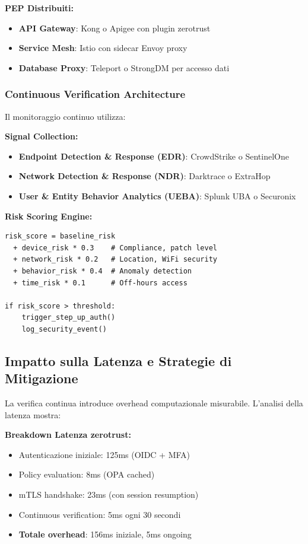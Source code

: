 \textbf{PEP Distribuiti:}
\begin{itemize}
    \item \textbf{API Gateway}: Kong o Apigee con plugin \gls{zerotrust}
    \item \textbf{Service Mesh}: Istio con sidecar Envoy proxy
    \item \textbf{Database Proxy}: Teleport o StrongDM per accesso dati
\end{itemize}

\subsubsection{\texorpdfstring{\textbf{Continuous Verification Architecture}}{3.5.3.2 - Continuous Verification Architecture}}

Il monitoraggio continuo utilizza:

\textbf{Signal Collection:}
\begin{itemize}
    \item \textbf{Endpoint Detection \& Response (EDR)}: CrowdStrike o SentinelOne
    \item \textbf{Network Detection \& Response (NDR)}: Darktrace o ExtraHop
    \item \textbf{User \& Entity Behavior Analytics (UEBA)}: Splunk UBA o Securonix
\end{itemize}

\textbf{Risk Scoring Engine:}
\begin{lstlisting}[caption={Calcolo Risk Score real-time},label={lst:risk_score}]
risk_score = baseline_risk
  + device_risk * 0.3    # Compliance, patch level
  + network_risk * 0.2   # Location, WiFi security  
  + behavior_risk * 0.4  # Anomaly detection
  + time_risk * 0.1      # Off-hours access

if risk_score > threshold:
    trigger_step_up_auth()
    log_security_event()
\end{lstlisting}

\subsection{\texorpdfstring{\textbf{Impatto sulla Latenza e Strategie di Mitigazione}}{3.5.4 - Impatto sulla Latenza e Strategie di Mitigazione}}

La verifica continua introduce overhead computazionale misurabile. L'analisi della latenza mostra:

\textbf{Breakdown Latenza \gls{zerotrust}:}
\begin{itemize}
    \item Autenticazione iniziale: 125ms (OIDC + MFA)
    \item Policy evaluation: 8ms (OPA cached)
    \item mTLS handshake: 23ms (con session resumption)
    \item Continuous verification: 5ms ogni 30 secondi
    \item \textbf{Totale overhead}: 156ms iniziale, 5ms ongoing
\end{itemize}

